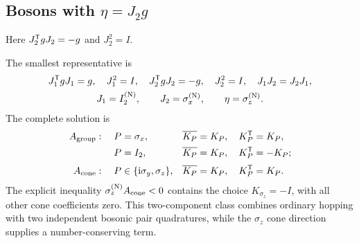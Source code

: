 \subsection{Bosons with \texorpdfstring{\(\eta=J_2g\)}{eta = J2 g}}

Here \(J_2^{\mathsf{T}} gJ_2=-g\) and \(J_2^2=I\).

The smallest representative is
\begin{equation}
\begin{gathered}
J_1^{\mathsf{T}} gJ_1=g,\quad J_1^2=I,\quad
J_2^{\mathsf{T}} gJ_2=-g,\quad J_2^2=I,\quad
J_1J_2=J_2J_1,\\
J_1=I_2^{({\rm N})},\qquad J_2=\sigma_x^{({\rm N})},\qquad \eta=\sigma_z^{({\rm N})}.
\end{gathered}
\end{equation}
The complete solution is
\begin{align*}
A_{\rm group}:\quad
P&=\sigma_x,&&\overline{K_P}=K_P,\quad K_P^{\mathsf{T}}=K_P,\\
P&=I_2,&&\overline{K_P}=K_P,\quad K_P^{\mathsf{T}}=-K_P;\\[2pt]
A_{\rm cone}:\quad
P&\in\{\mathrm{i}\sigma_y,\sigma_z\},&&\overline{K_P}=K_P,\quad K_P^{\mathsf{T}}=K_P.
\end{align*}
The explicit inequality \(\sigma_z^{({\rm N})}A_{\rm cone}<0\) contains the choice
\(K_{\sigma_z}=-I\), with all other cone coefficients zero.  This two-component class combines ordinary hopping with two independent bosonic pair quadratures, while the \(\sigma_z\) cone direction supplies a number-conserving term.

